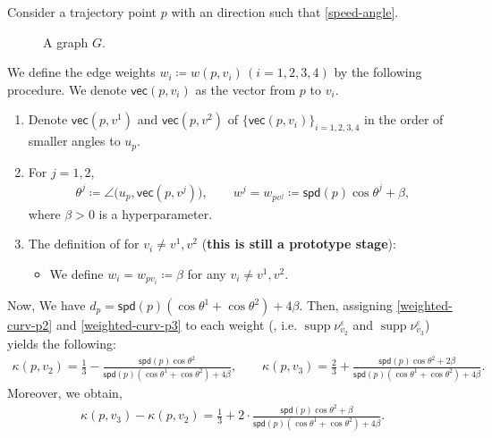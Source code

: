\documentclass{article}
\numberwithin{equation}{section}
\theoremstyle{definition}
\newcommand{\B}{\beta}
\newcommand{\K}{\kappa}
\newcommand{\eps}{\varepsilon} %
\newcommand{\vect}{\mathsf{vec}}
\newcommand{\spd}{\mathsf{spd}}
\DeclareMathOperator\supp{supp} %
\def\:={\coloneqq} %
\def\blue(#1){\textcolor{blue}{#1}}
\begin{document}
Consider a trajectory point $p$ with an direction such that \autoref{speed-angle}.

\begin{figure}[H]
\begin{center}
\caption{A graph $G$.} \label{speed-angle}
\end{center}
\end{figure}

We define the edge weights $w_i\:=w(p,v_i)\,(i=1,2,3,4)$ by the following procedure.
We denote $\vect(p,v_i)$ as the vector from $p$ to $v_i$.
\begin{enumerate}
    \item Denote $\vect(p,v^1)$ and $\vect(p,v^2)$ of $\big\{ \vect(p,v_i) \big\}_{i=1,2,3,4}$ in the order of smaller angles to $u_p$.
    \item For $j=1,2$,
    \begin{align*}
        \theta^j \:= \angle\big(u_p,\vect(p,v^j)\big), \qquad w^j = w_{pv^j} \:= \spd(p)\cos\theta^j+\B,
    \end{align*}
    where $\B>0$ is a hyperparameter.
    \item The definition of for $v_i\neq v^1,v^2$ (\textbf{this is still a prototype stage}):
    \begin{itemize}
        \item We define $w_i=w_{pv_i}\:=\B$ for any $v_i\neq v^1,v^2$.
    \end{itemize}
\end{enumerate}

Now, We have $d_p=\spd(p)(\cos\theta^1+\cos\theta^2)+4\B$.
Then, assigning \eqref{weighted-curv-p2} and \eqref{weighted-curv-p3} to each weight \big(, i.e.  $\supp\nu_{v_2}^\eps$ and $\supp\nu_{v_3}^\eps$\big) yields the following: 
\begin{align*}
    \K(p,v_2) = \frac{1}{3} - \frac{\spd(p)\cos\theta^2}{\spd(p)(\cos\theta^1+\cos\theta^2)+4\B}, \qquad 
    \K(p,v_3) = \frac{2}{3} + \frac{\spd(p)\cos\theta^2+2\B}{\spd(p)(\cos\theta^1+\cos\theta^2)+4\B}.
\end{align*}
Moreover, we obtain,
\begin{align}
    \K(p,v_3)-\K(p,v_2) = \frac{1}{3} + 2\cdot\frac{\spd(p)\cos\theta^2+\B}{\spd(p)(\cos\theta^1+\cos\theta^2)+4\B}. \label{curv-difference}
\end{align}
\end{document}
